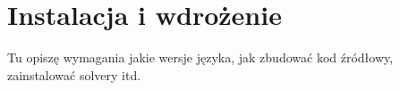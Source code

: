 \chapter{Instalacja i wdrożenie}
\thispagestyle{chapterBeginStyle}

Tu opiszę wymagania jakie wersje języka, jak zbudować kod źródłowy, zainstalować solvery itd.
